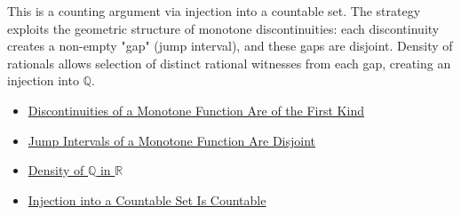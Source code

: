 \begin{remark*}
This is a counting argument via injection into a countable set. The strategy exploits the geometric structure of monotone discontinuities: each discontinuity creates a non-empty "gap" (jump interval), and these gaps are disjoint. Density of rationals allows selection of distinct rational witnesses from each gap, creating an injection into $\mathbb{Q}$.
\end{remark*}

\begin{dependencies}
\begin{itemize}
  \item \hyperref[prop:monotone-discontinuities-first-kind]{Discontinuities of a Monotone Function Are of the First Kind}
  \item \hyperref[cor:jump-intervals-for-monotone-discontinuities]{Jump Intervals of a Monotone Function Are Disjoint}
  \item \hyperref[thm:density-of-rationals-in-reals]{Density of $\mathbb{Q}$ in $\mathbb{R}$}
  \item \hyperref[thm:countable-injection]{Injection into a Countable Set Is Countable}
\end{itemize}
\end{dependencies}

\clearpage
